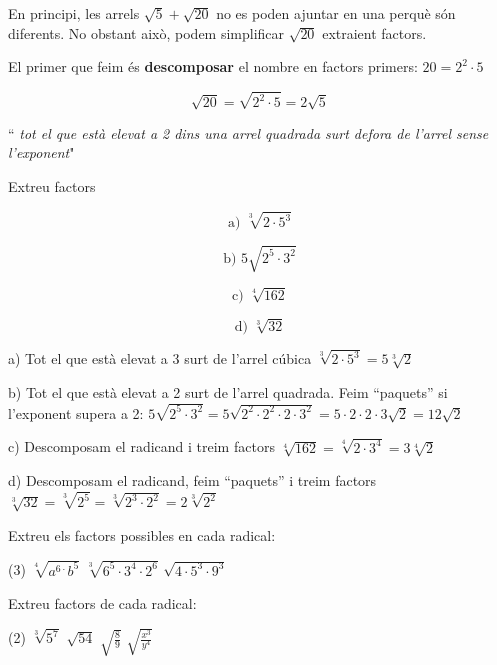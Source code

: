 \begin{theorybox}
 En principi, les arrels $\sqrt{5} + \sqrt{20}$ no es poden ajuntar en una perquè són diferents. No obstant això, podem simplificar $\sqrt{20}$ extraient factors. 
 
 El primer que feim és \textbf{descomposar} el nombre en factors primers: $20 = 2^2 \cdot 5$
 
 \[ \sqrt{20} = \sqrt{ \boxed{2^2} \cdot 5} = \boxed{2} \sqrt{5} \]
 

``{  \normalfont \textit{tot el que està elevat a 2 dins una arrel quadrada surt defora de l'arrel sense l'exponent}}"
 
\end{theorybox}

\begin{resolt}[E]{
 Extreu factors 
 
  \[ \text{a) } \sqrt[3]{2 \cdot 5^3 } \]

 \[\text{b) } 5\sqrt{2^5 \cdot 3^2 } \]

 \[\text{c) } \sqrt[4]{162 } \]

 \[\text{d) } \sqrt[3]{32} \]
}

a) Tot el que està elevat a 3 surt de l'arrel cúbica $ \sqrt[3]{2 \cdot 5^3 }=  5 \sqrt[3]{2}$
\vspace{0.25cm}


b) Tot el que està elevat a 2 surt de l'arrel quadrada. Feim ``paquets'' si l'exponent supera a 2:  $  5\sqrt{2^5 \cdot 3^2 } = 5\sqrt{2^2 \cdot 2^2 \cdot 2 \cdot 3^2}=5\cdot 2 \cdot 2 \cdot 3\sqrt{ 2} =12 \sqrt{2}$
\vspace{0.25cm}


c) Descomposam el radicand i treim factors $ \sqrt[4]{162 }= \sqrt[4]{2\cdot 3^4 }= 3 \sqrt[4]{2}$
\vspace{0.25cm}

d) Descomposam el radicand, feim ``paquets'' i treim factors  $ \sqrt[3]{32}=\sqrt[3]{2^5}=\sqrt[3]{2^3 \cdot 2^2}=2\sqrt[3]{2^2}$ 
\end{resolt}

\begin{mylist}
 \exer[1]  Extreu els factors possibles en cada radical:  
 \begin{tasks}(3)
 	\task  $\sqrt[{4}]{a^{6\cdot } b^{5} } $  \task  $\sqrt[{3}]{6^{5} \cdot 3^{4} \cdot 2^{6} } $  \task  $\sqrt{4\cdot 5^{3} \cdot 9^{3} } $
 \end{tasks}
 
 \exer[1]  Extreu factors de cada radical: 
 \begin{tasks}(2)
 	\task  $\sqrt[{3}]{5^7} $   \task  $\sqrt{54} $    \task  $\sqrt{\frac{8}{9} } $        \task $\sqrt{\frac{x^{3} }{y^4} } $
 \end{tasks}
\end{mylist}

